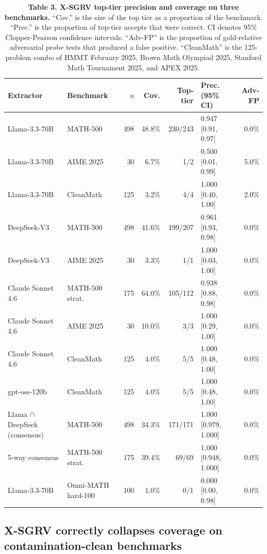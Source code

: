 \documentclass[11pt]{article}
\begin{document}
\begin{table}[h]
\centering
\caption{\textbf{Table 3. X-SGRV top-tier precision and coverage on three benchmarks.} ``Cov.'' is the size of the top tier as a proportion of the benchmark. ``Prec.'' is the proportion of top-tier accepts that were correct. CI denotes 95\% Clopper-Pearson confidence intervals. ``Adv-FP'' is the proportion of gold-relative adversarial probe tests that produced a false positive. ``CleanMath'' is the 125-problem combo of HMMT February 2025, Brown Math Olympiad 2025, Stanford Math Tournament 2025, and APEX 2025.}
\label{tab:xsgrv}
\small
\begin{tabular}{llrrrlr}
\toprule
Extractor & Benchmark & $n$ & Cov. & Top-tier & Prec. (95\% CI) & Adv-FP \\
\midrule
Llama-3.3-70B & MATH-500 & 498 & 48.8\% & 230/243 & 0.947 [0.91, 0.97] & 0.0\% \\
Llama-3.3-70B & AIME 2025 & 30 & 6.7\% & 1/2 & 0.500 [0.01, 0.99] & 5.0\% \\
Llama-3.3-70B & CleanMath & 125 & 3.2\% & 4/4 & 1.000 [0.40, 1.00] & 2.0\% \\
DeepSeek-V3 & MATH-500 & 498 & 41.6\% & 199/207 & 0.961 [0.93, 0.98] & 0.0\% \\
DeepSeek-V3 & AIME 2025 & 30 & 3.3\% & 1/1 & 1.000 [0.03, 1.00] & 0.0\% \\
Claude Sonnet 4.6 & MATH-500 strat. & 175 & 64.0\% & 105/112 & 0.938 [0.88, 0.98] & 0.0\% \\
Claude Sonnet 4.6 & AIME 2025 & 30 & 10.0\% & 3/3 & 1.000 [0.29, 1.00] & 0.0\% \\
Claude Sonnet 4.6 & CleanMath & 125 & 4.0\% & 5/5 & 1.000 [0.48, 1.00] & 0.0\% \\
gpt-oss-120b & CleanMath & 125 & 4.0\% & 5/5 & 1.000 [0.48, 1.00] & 0.0\% \\
\midrule
Llama $\cap$ DeepSeek (consensus) & MATH-500 & 498 & 34.3\% & 171/171 & 1.000 [0.979, 1.000] & 0.0\% \\
5-way consensus & MATH-500 strat. & 175 & 39.4\% & 69/69 & 1.000 [0.948, 1.000] & 0.0\% \\
\midrule
Llama-3.3-70B & Omni-MATH hard-100 & 100 & 1.0\% & 0/1 & 0.000 [0.00, 0.98] & 0.0\% \\
\bottomrule
\end{tabular}
\end{table}

\subsection{X-SGRV correctly collapses coverage on contamination-clean benchmarks}
\end{document}
